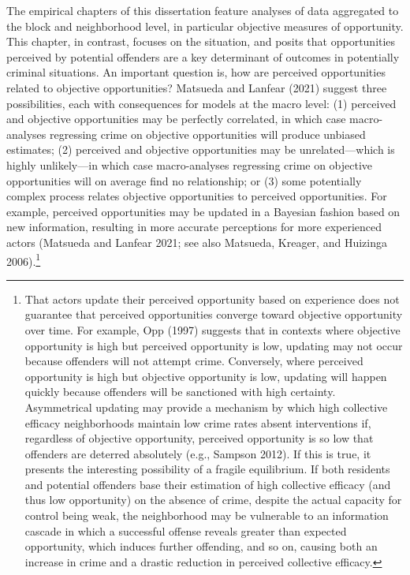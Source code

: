 \documentclass [11pt, proquest] {uwthesis}[2015/03/03]
\begin{document}
The empirical chapters of this dissertation feature analyses of data aggregated to the block and neighborhood level, in particular objective measures of opportunity. This chapter, in contrast, focuses on the situation, and posits that opportunities perceived by potential offenders are a key determinant of outcomes in potentially criminal situations. An important question is, how are perceived opportunities related to objective opportunities? Matsueda and Lanfear (2021) suggest three possibilities, each with consequences for models at the macro level: (1) perceived and objective opportunities may be perfectly correlated, in which case macro-analyses regressing crime on objective opportunities will produce unbiased estimates; (2) perceived and objective opportunities may be unrelated---which is highly unlikely---in which case macro-analyses regressing crime on objective opportunities will on average find no relationship; or (3) some potentially complex process relates objective opportunities to perceived opportunities. For example, perceived opportunities may be updated in a Bayesian fashion based on new information, resulting in more accurate perceptions for more experienced actors (Matsueda and Lanfear 2021; see also Matsueda, Kreager, and Huizinga 2006).\footnote{That actors update their perceived opportunity based on experience does not guarantee that perceived opportunities converge toward objective opportunity over time. For example, Opp (1997) suggests that in contexts where objective opportunity is high but perceived opportunity is low, updating may not occur because offenders will not attempt crime. Conversely, where perceived opportunity is high but objective opportunity is low, updating will happen quickly because offenders will be sanctioned with high certainty. Asymmetrical updating may provide a mechanism by which high collective efficacy neighborhoods maintain low crime rates absent interventions if, regardless of objective opportunity, perceived opportunity is so low that offenders are deterred absolutely (e.g., Sampson 2012). If this is true, it presents the interesting possibility of a fragile equilibrium. If both residents and potential offenders base their estimation of high collective efficacy (and thus low opportunity) on the absence of crime, despite the actual capacity for control being weak, the neighborhood may be vulnerable to an information cascade in which a successful offense reveals greater than expected opportunity, which induces further offending, and so on, causing both an increase in crime and a drastic reduction in perceived collective efficacy.}
\end{document}

